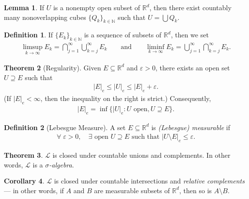 \documentclass[a4paper,9pt]{extarticle}
\DeclareMathOperator*{\vol}{vol}
\theoremstyle{definition}
\newtheorem{defin}{Definition}
\newtheorem{thm}{Theorem}
\newtheorem{lem}[thm]{Lemma}
\newtheorem{cor}[thm]{Corollary}
\begin{document}
\sloppy
\begin{lem}
    If $U$ is a nonempty open subset of $\mathbb{R}^d$, then there exist countably many nonoverlapping cubes $\{Q_k\}_{k \in \mathbb{N}}$ such that $U = \bigcup Q_k$.
\end{lem}

\begin{defin}
    If $\{ E_k \}_{k \in \mathbb{N}}$ is a sequence of subsets of $\mathbb{R}^d$, then we set
    \begin{align*}
        \limsup_{k \to \infty} E_k = \bigcap_{j = 1}^\infty \bigcup_{k = j}^\infty E_k
        \qquad \text{and} \qquad
        \liminf_{k \to \infty} E_k = \bigcup_{j = 1}^\infty \bigcap_{k = j}^\infty E_k.
    \end{align*}
\end{defin}
\begin{thm}[Regularity]
    Given $E \subseteq \mathbb{R}^d$ and $\varepsilon > 0$, there exists an open set $U \supseteq E$ such that
    \begin{align*}
        |E|_e \leq |U|_e \leq |E|_e + \varepsilon.
    \end{align*}
    (If $|E|_e < \infty$, then the inequality on the right is strict.) Consequently,
    \begin{align*}
        |E|_e = \inf\{ |U|_e : U \text{ open}, U \supseteq E \}.
    \end{align*}
\end{thm}
\begin{defin}[Lebesgue Measure]
    A set $E \subseteq \mathbb{R}^d$ is \emph{(Lebesgue) measurable} if
    \begin{align*}
        \forall\; \varepsilon > 0, \quad \exists \text{ open } U \supseteq E \text{ such that } |U \setminus E|_e \leq \varepsilon.
    \end{align*}
\end{defin}
\begin{thm}
    $\mathcal{L}$ is closed under countable unions and complements. In other words, $\mathcal{L}$ is a \emph{$\sigma$-algebra}.
\end{thm}
\begin{cor}
    $\mathcal{L}$ is closed under countable intersections and \emph{relative complements} --- in other words, if $A$ and $B$ are measurable subsets of $\mathbb{R}^d$, then so is $A \setminus B$.
\end{cor}
\end{document}
